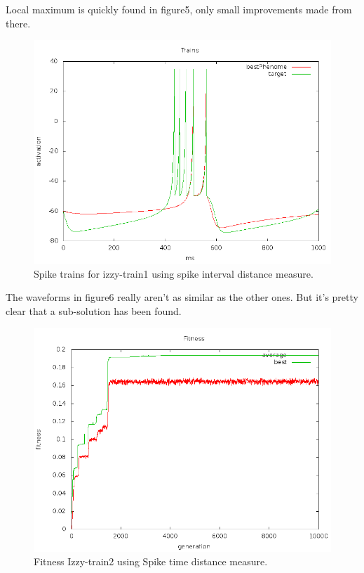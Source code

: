 \documentclass[a4paper]{article}
\begin{document}
Local maximum is quickly found in figure5, only small improvements made from there.

\begin{figure}[htb!]
  \centering
  \includegraphics[width=\textwidth]{Waveform-izzy1-trains-plot.png}
  \caption{Spike trains for izzy-train1 using spike interval distance measure.}
\end{figure}

The waveforms in figure6 really aren't as similar as the other ones. But it's pretty clear that a sub-solution has been found.

\newpage

\begin{figure}[htb!]
  \centering
  \includegraphics[width=\textwidth]{SpikeTime-izzy2-fitness-plot.png}
  \caption{Fitness Izzy-train2 using Spike time distance measure.}
\end{figure}
\end{document}
